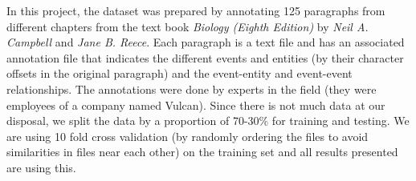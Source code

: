 In this project, the dataset was prepared by annotating 125 paragraphs from different chapters from the text book {\em Biology (Eighth Edition)} by {\em Neil A. Campbell} and {\em Jane B. Reece}. Each paragraph is a text file and has an associated annotation file that indicates the different events and entities (by their character offsets in the original paragraph) and the event-entity and event-event relationships. The annotations were done by experts in the field (they were employees of a company named Vulcan). Since there is not much data at our disposal, we split the data by a proportion of 70-30\% for training and testing. We are using 10 fold cross validation (by randomly ordering the files to avoid similarities in files near each other) on the training set and all results presented are using this.